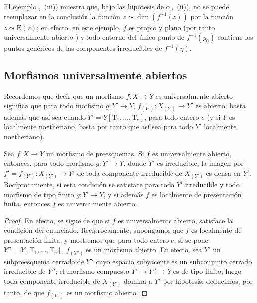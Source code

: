\begin{remark}[14.2.7]
\label{IV.14.2.7}
El ejemplo ,~(iii)) muestra que, bajo las hipótesis de  o ,~(ii)), no se puede reemplazar en la conclusión la función $z\leadsto\dim(f^{-1}(z))$ por la función $z\leadsto\mathrm{E}(z)$; en efecto, en este ejemplo, $f$ es propio y plano (por tanto universalmente abierto ) y todo entorno del único punto de $f^{-1}(y_0)$ contiene los puntos genéricos de las componentes irreducibles de $f^{-1}(\eta)$.
\end{remark}


\subsection{Morfismos universalmente abiertos}
\label{subsection:IV.14.3}
\label{IV.14.3}

\begin{env}[14.3.1]
\label{IV.14.3.1}
Recordemos  que decir que un morfismo $f:X\to Y$ es universalmente abierto significa que para todo morfismo $g:Y'\to Y$, $f_{(Y')}:X_{(Y')}\to Y'$ es abierto; basta además que así sea cuando $Y'=Y[\mathrm{T}_1,\ldots,\mathrm{T}_e]$, para todo entero $e$  (y si $Y$ es localmente noetheriano, basta por tanto que así sea para todo $Y'$ localmente noetheriano).
\end{env}

\begin{proposition}[14.3.2]
\label{IV.14.3.2}
Sea $f:X\to Y$ un morfismo de preesquemas.
Si $f$ es universalmente abierto, entonces, para todo morfismo $g:Y'\to Y$, donde $Y'$ es irreducible, la imagen por $f'=f_{(Y')}:X_{(Y')}\to Y'$ de toda componente irreducible de $X_{(Y')}$ es densa en $Y'$.
Recíprocamente, si esta condición se satisface para todo $Y'$ irreducible y todo morfismo de tipo finito $g:Y'\to Y$, y si además $f$ es localmente de presentación finita, entonces $f$ es universalmente abierto.
\end{proposition}

\begin{proof}
En efecto, se sigue de  que si $f$ es universalmente abierto, satisface la condición del enunciado.
Recíprocamente, supongamos que $f$ es localmente de presentación finita, y mostremos que para todo entero $e$, si se pone $Y''=Y[\mathrm{T}_1,\ldots,\mathrm{T}_e]$, $f_{(Y'')}$ es un morfismo abierto.
En efecto, sea $Y'$ un subpreesquema cerrado de $Y''$ cuyo espacio subyacente es un subconjunto cerrado irreducible de $Y''$; el morfismo compuesto $Y'\to Y''\to Y$ es de tipo finito, luego toda componente irreducible de $X_{(Y')}$ domina a $Y'$ por hipótesis; deducimos, por tanto, de  que $f_{(Y'')}$ es un morfismo abierto.
\end{proof}

